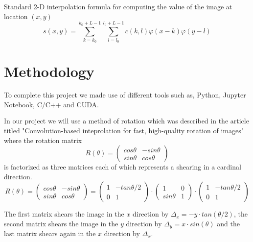 \documentclass[]{usiinfbachelorproject}
\begin{document}
	Standard 2-D interpolation formula for computing the value of the image at location $(x,y)$
	\begin{equation}
		s(x,y) = \sum_{k = k_0}^{k_0+L-1}\sum_{l=l_0}^{l_0+L-1} c(k,l)\varphi(x-k)\varphi(y-l)
	\end{equation}
	
	\fi
	

	\section{Methodology}
	To complete this project we made use of different tools such as, Python, Jupyter Notebook, C/C++ and CUDA.
	
		In our project we will use a method of rotation which was described in the article titled "Convolution-based inteprolation for fast, high-quality rotation of images"\cite{main_article} where the rotation matrix
	\begin{equation*}
		R(\theta) = 
		\begin{pmatrix}
			cos\theta & -sin\theta\\
			sin\theta & cos\theta
		\end{pmatrix}
	\end{equation*} 
	is factorized as three matrices each of which represents a shearing in a cardinal direction.
	\begin{equation*}
		R(\theta) = 
		\begin{pmatrix}
			cos\theta & -sin\theta\\
			sin\theta & cos\theta
		\end{pmatrix}
		=
		\begin{pmatrix}
			1 & -tan\theta/2\\
			0 & 1
		\end{pmatrix}
		\cdot
		\begin{pmatrix}
			1 & 0\\
			sin\theta & 1
		\end{pmatrix}
		\cdot
		\begin{pmatrix}
			1 & -tan\theta/2\\
			0 & 1
		\end{pmatrix}
	\end{equation*} 
	
	The first matrix shears the image in the $x$ direction by $\Delta_x = -y\cdot tan(\theta/2)$, the second matrix shears the image in the $y$ direction by $\Delta_y = x \cdot sin(\theta)$ and the last matrix shears again in the $x$ direction by $\Delta_x$.\\
	
\end{document}
